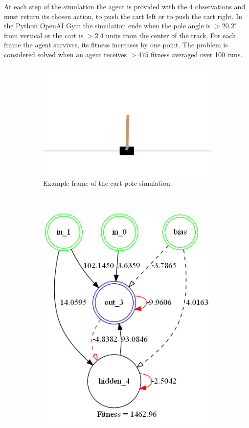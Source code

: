 \documentclass[twocolumn,letterpaper]{article}
\begin{document}
At each step 
of the simulation the agent is provided with the 4 observations and must return its chosen action, to push
the cart left or to push the cart right. In the Python OpenAI Gym \cite{gym} the simulation ends when the
pole angle is $> 20.2^{\circ}$ from vertical or the cart is $> 2.4$ units from the center of the track. For each
frame the agent survives, its fitness increases by one point. The problem is considered solved when an agent
receives $> 475$ fitness averaged over 100 runs. 

\begin{figure}[h]
	\centering
	\begin{subfigure}[b]{0.3\textwidth}
		\includegraphics[width=\textwidth]{images/pole_balance.png}
		\caption{Example frame of the cart pole simulation.}
	\end{subfigure}
	~
	\begin{subfigure}[b]{0.3\textwidth}
		\includegraphics[width=\textwidth]{images/cart_pole_final.png}

\end{subfigure}
\end{figure}
\end{document}
